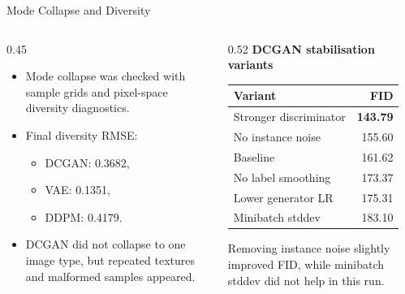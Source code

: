 \documentclass[aspectratio=169]{beamer}
\begin{document}
\begin{frame}{Mode Collapse and Diversity}
  \begin{columns}[T]
    \begin{column}{0.45\linewidth}
      \small
      \begin{itemize}
        \item Mode collapse was checked with sample grids and pixel-space diversity diagnostics.
        \item Final diversity RMSE:
          \begin{itemize}
            \item DCGAN: 0.3682,
            \item VAE: 0.1351,
            \item DDPM: 0.4179.
          \end{itemize}
        \item DCGAN did not collapse to one image type, but repeated textures and malformed samples appeared.
      \end{itemize}
    \end{column}
    \begin{column}{0.52\linewidth}
      \centering
      \scriptsize
      \textbf{DCGAN stabilisation variants}\\[0.1cm]
      \begin{tabular}{lr}
        \toprule
        Variant & FID \\
        \midrule
        Stronger discriminator & \textbf{143.79} \\
        No instance noise & 155.60 \\
        Baseline & 161.62 \\
        No label smoothing & 173.37 \\
        Lower generator LR & 175.31 \\
        Minibatch stddev & 183.10 \\
        \bottomrule
      \end{tabular}

      \vspace{0.2cm}
      \footnotesize
      Removing instance noise slightly improved FID, while minibatch stddev did not help in this run.
    \end{column}
  \end{columns}
\end{frame}
\end{document}

